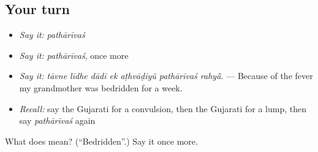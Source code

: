\subsection*{Your turn}
\begin{itemize}
\raggedright
  \item \emph{Say it:} \emph{pathārīvaś}
  \item \emph{Say it:} \emph{pathārīvaś}, once more
  \item \emph{Say it:} \emph{tāvne līdhe dādī ek aṭhvāḍiyũ pathārīvaś rahyā̃.} — Because of the fever my grandmother was bedridden for a week.
  \item \emph{Recall:} say the Gujarati for a convulsion, then the Gujarati for a lump, then say \emph{pathārīvaś} again
\end{itemize}

\begin{tcolorbox}[breakable,colback=teal!4,colframe=teal!35!black,title={Before you move on}]
What does  mean? (\textquotedblleft{}Bedridden\textquotedblright{}.) Say it once more.
\end{tcolorbox}
